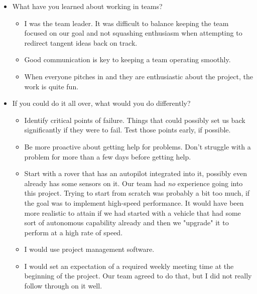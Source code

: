 \documentclass[compsoc,draftclsnofoot,onecolumn,10pt]{IEEEtran}
\begin{document}
\begin{itemize}
    \item What have you learned about working in teams?
        \begin{itemize}
        \item I was the team leader. It was difficult to balance keeping the team focused on our goal and not squashing enthusiasm when attempting to redirect tangent ideas back on track.
        \item Good communication is key to keeping a team operating smoothly.
        \item When everyone pitches in and they are enthusiastic about the project, the work is quite fun.
    \end{itemize}
    
    \item If you could do it all over, what would you do differently?
    \begin{itemize}
        \item Identify critical points of failure. Things that could possibly set us back significantly if they were to fail.
        \subitem Test those points early, if possible.
        \item Be more proactive about getting help for problems. Don't struggle with a problem for more than a few days before getting help. 
        \item Start with a rover that has an autopilot integrated into it, possibly even already has some sensors on it.
        \subitem Our team had \textit{no} experience going into this project. Trying to start from scratch was probably a bit too much, if the goal was to implement high-speed performance. It would have been more realistic to attain if we had started with a vehicle that had some sort of autonomous capability already and then we "upgrade" it to perform at a high rate of speed.
        \item I would use project management software.
        \item I would set an expectation of a required weekly meeting time at the beginning of the project. Our team agreed to do that, but I did not really follow through on it well.
    \end{itemize}
\end{itemize}
\end{document}
